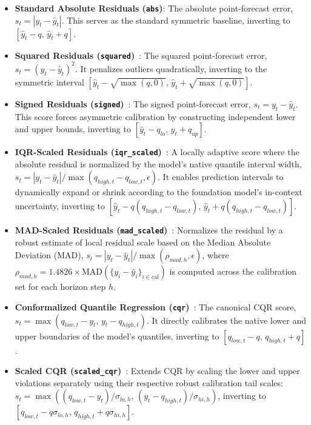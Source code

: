 \documentclass[12pt, a4paper]{article}
\begin{document}
\begin{itemize}
	\item \textbf{Standard Absolute Residuals (\texttt{abs})}: The absolute point-forecast error, \(s_t = |y_t - \hat{y}_t|\). This serves as the standard symmetric baseline, inverting to \([\hat{y}_t - q, \, \hat{y}_t + q]\).
	\item \textbf{Squared Residuals (\texttt{squared})}~\cite{lei2018distribution}: The squared point-forecast error, \(s_t = (y_t - \hat{y}_t)^2\). It penalizes outliers quadratically, inverting to the symmetric interval \([\hat{y}_t - \sqrt{\max(q, 0)}, \, \hat{y}_t + \sqrt{\max(q, 0)}]\).
	\item \textbf{Signed Residuals (\texttt{signed})}~\cite{lei2018distribution}: The signed point-forecast error, \(s_t = y_t - \hat{y}_t\). This score forces asymmetric calibration by constructing independent lower and upper bounds, inverting to \([\hat{y}_t - q_{lo}, \, \hat{y}_t + q_{up}]\).
	\item \textbf{IQR-Scaled Residuals (\texttt{iqr\_scaled})}~\cite{lei2018distribution}: A locally adaptive score where the absolute residual is normalized by the model's native quantile interval width, \(s_t = |y_t - \hat{y}_t| / \max(q_{high, t} - q_{low, t}, \epsilon)\). It enables prediction intervals to dynamically expand or shrink according to the foundation model's in-context uncertainty, inverting to \([\hat{y}_t - q(q_{high, t} - q_{low, t}), \, \hat{y}_t + q(q_{high, t} - q_{low, t})]\).
	\item \textbf{MAD-Scaled Residuals (\texttt{mad\_scaled})}~\cite{lei2018distribution}: Normalizes the residual by a robust estimate of local residual scale based on the Median Absolute Deviation (MAD), \(s_t = |y_t - \hat{y}_t| / \max(\rho_{mad, h}, \epsilon)\), where \(\rho_{mad, h} = 1.4826 \times \text{MAD}(\{y_i - \hat{y}_i\}_{i \in \text{cal}})\) is computed across the calibration set for each horizon step \(h\).
	\item \textbf{Conformalized Quantile Regression (\texttt{cqr})}~\cite{cqr}: The canonical CQR score, \(s_t = \max(q_{low, t} - y_t, \, y_t - q_{high, t})\). It directly calibrates the native lower and upper boundaries of the model's quantiles, inverting to \([q_{low, t} - q, \, q_{high, t} + q]\).
	\item \textbf{Scaled CQR (\texttt{scaled\_cqr})}~\cite{cqr}: Extends CQR by scaling the lower and upper violations separately using their respective robust calibration tail scales: \(s_t = \max((q_{low, t} - y_t)/\sigma_{lo, h}, \, (y_t - q_{high, t})/\sigma_{hi, h})\), inverting to \([q_{low, t} - q\sigma_{lo, h}, \, q_{high, t} + q\sigma_{hi, h}]\).

\end{itemize}
\end{document}
